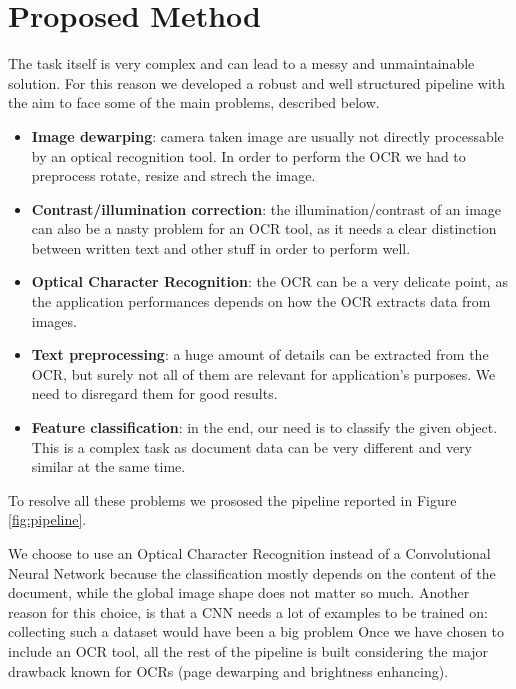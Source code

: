 \documentclass[10pt,twocolumn,letterpaper]{article}
\begin{document}
\section{Proposed Method}
\label{sec:proposed-method}

The task itself is very complex and can lead to a messy and
unmaintainable solution. For this reason we developed a robust and
well structured pipeline with the aim to face some of the main
problems, described below.

\begin{itemize}
  \item \textbf{Image dewarping}: camera taken image are usually not
    directly processable by an optical recognition tool. In order to
    perform the OCR we had to preprocess rotate, resize and strech the
    image.
  \item \textbf{Contrast/illumination correction}: the
    illumination/contrast of an image can also be a nasty problem for
    an OCR tool, as it needs a clear distinction between written text
    and other stuff in order to perform well.
  \item \textbf{Optical Character Recognition}: the OCR can be a very
    delicate point, as the application performances depends on how the
    OCR extracts data from images.
  \item \textbf{Text preprocessing}: a huge amount of details can be
    extracted from the OCR, but surely not all of them are relevant
    for application's purposes. We need to disregard them for good
    results.
  \item \textbf{Feature classification}: in the end, our need is to
    classify the given object. This is a complex task as document data
    can be very different and very similar at the same time.
\end{itemize}

To resolve all these problems we prososed the pipeline reported in
Figure \ref{fig:pipeline}.

We choose to use an Optical Character Recognition instead of a
Convolutional Neural Network because the classification mostly depends
on the content of the document, while the global image shape does not
matter so much.  Another reason for this choice, is that a CNN needs a
lot of examples to be trained on: collecting such a dataset would have
been a big problem Once we have chosen to include an OCR tool, all the
rest of the pipeline is built considering the major drawback known for
OCRs (page dewarping and brightness enhancing).
\end{document}
